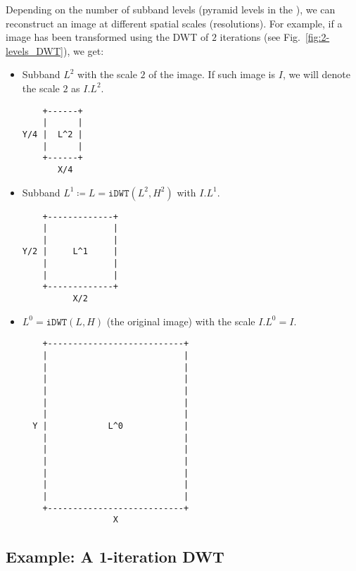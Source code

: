 Depending on the number of subband levels (pyramid levels in the
), we can reconstruct an image at
different spatial scales (resolutions). For example, if a image has
been transformed using the DWT of $2$ iterations (see
Fig.~\ref{fig:2-levels_DWT}), we get:
\begin{itemize}
\item Subband $L^2$ with the scale $2$ of the image. If such image is
  $I$, we will denote the scale $2$ as $I.L^2$.
\begin{verbatim}
    +------+
    |      |
Y/4 |  L^2 |
    |      |
    +------+
       X/4
\end{verbatim}
\item Subband $L^1\coloneqq L=\mathtt{iDWT}(L^2, H^2)$
  with $I.L^1$.
\begin{verbatim}
    +-------------+
    |             |
    |             |
Y/2 |     L^1     |
    |             | 
    |             |
    +-------------+
          X/2
\end{verbatim}
  
\item $L^0=\mathtt{iDWT}(L, H)$ (the original image) with
  the scale $I.L^0=I$.
\begin{verbatim}
    +---------------------------+
    |                           |
    |                           |
    |                           | 
    |                           |
    |                           |
    |                           |
  Y |            L^0            |
    |                           | 
    |                           |
    |                           | 
    |                           | 
    |                           |
    |                           |
    +---------------------------+
                  X
\end{verbatim}
\end{itemize}



\subsection*{Example: A 1-iteration DWT}

